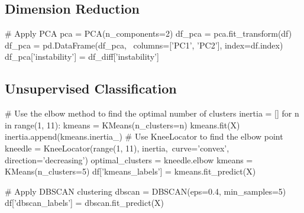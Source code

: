 \documentclass[twocolumn]{article}
\begin{document}
\begin{appendices}
\subsection{Dimension Reduction}
\begin{python}
# Apply PCA
pca = PCA(n_components=2)
df_pca = pca.fit_transform(df)
df_pca = pd.DataFrame(df_pca, \
columns=['PC1', 'PC2'], index=df.index)
df_pca['instability'] = df_diff['instability']
\end{python}
\newpage
\subsection{Unsupervised Classification}
\begin{python}
# Use the elbow method to find the optimal number of clusters
inertia = []
for n in range(1, 11):
    kmeans = KMeans(n_clusters=n)
    kmeans.fit(X)
    inertia.append(kmeans.inertia_)
# Use KneeLocator to find the elbow point
kneedle = KneeLocator(range(1, 11), inertia,\
curve='convex', direction='decreasing')
optimal_clusters = kneedle.elbow
kmeans = KMeans(n_clusters=5)
df['kmeans_labels'] = kmeans.fit_predict(X)

# Apply DBSCAN clustering
dbscan = DBSCAN(eps=0.4, min_samples=5)
df['dbscan_labels'] = dbscan.fit_predict(X)
\end{python}

\end{appendices}
\end{document}
